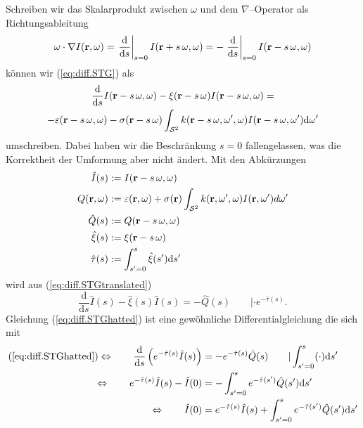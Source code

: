 	Schreiben wir das Skalarprodukt zwischen $\omega$ und dem $\nabla$--Operator als Richtungsableitung
	\newcommand{\dds}{\frac{\text{d}}{\text{d}s}}
	\newcommand{\ddszero}{\left. \dds \right|_{s=0}}
	\begin{equation*}
		\omega \cdot \nabla I(\location{r},\omega)
		=  \ddszero I(\location{r}+s\,\omega,\omega)
		=  -\ddszero I(\location{r}-s\,\omega,\omega)
	\end{equation*}
	können wir (\ref{eq:diff.STG}) als
	\begin{multline}
		\dds I(\location{r}-s\,\omega,\omega) - \xi(\location{r}-s\,\omega)I(\location{r}-s\,\omega,\omega) = \\-\varepsilon(\location{r}-s\,\omega,\omega) -\sigma(\location{r}-s\,\omega) \int_{\mathcal{S}^2} k(\location{r}-s\,\omega,\omega',\omega)I(\location{r}-s\,\omega,\omega') \text{d}\omega'
		\label{eq:diff.STGtranslated}
	\end{multline}
	umschreiben. Dabei haben wir die Beschränkung $s=0$ fallengelassen, was die Korrektheit der Umformung aber nicht ändert. Mit den Abkürzungen
	\begin{align*}
		{\hat I}(s)&:=I(\mathbf{r}-s\,\omega,\omega) \\
		Q(\mathbf{r},\omega)&:= \varepsilon(\mathbf{r},\omega)+\sigma(\mathbf{r}) \int_{\mathcal{S}^2} k(\mathbf{r},\omega',\omega)I(\mathbf{r},\omega') d\omega' \\
		{\hat Q}(s)&:=Q(\mathbf{r}-s\,\omega,\omega)\\
		{\hat \xi}(s)&:=\xi(\mathbf{r}-s\,\omega) \\
		{\hat \tau}(s)&:= \int_{s'=0}^{s} {\hat \xi}(s') \text{d}s'
	\end{align*}
	wird aus (\ref{eq:diff.STGtranslated})
	\begin{equation}
		\dds {\hat I}(s) - {\hat \xi}(s){\hat I}(s)= -{\hat Q}(s) \qquad |\cdot e^{-{\hat \tau}(s)}.
		\label{eq:diff.STGhatted}
	\end{equation}
	Gleichung (\ref{eq:diff.STGhatted}) ist eine gewöhnliche Differentialgleichung die sich mit
	\begin{align}
		(\ref{eq:diff.STGhatted})\Leftrightarrow\qquad \dds \left(e^{-{\hat \tau}(s)} {\hat I}(s)\right)&= -e^{-{\hat \tau}(s)} {\hat Q}(s) \qquad | \int_{s'=0}^s (\cdot)\text{d}s' \nonumber \\
		\Leftrightarrow\qquad e^{-{\hat \tau}(s)} {\hat I}(s) - {\hat I}(0) &= -\int_{s'=0}^s e^{-{\hat \tau}(s')} {\hat Q}(s') \text{d}s' \nonumber \\
		\Leftrightarrow\qquad {\hat I}(0) &= e^{-{\hat \tau}(s)} {\hat I}(s) + \int_{s'=0}^s e^{-{\hat \tau}(s')} {\hat Q}(s') \text{d}s' \label{eq:diff.STGpreintegral}
	\end{align}
